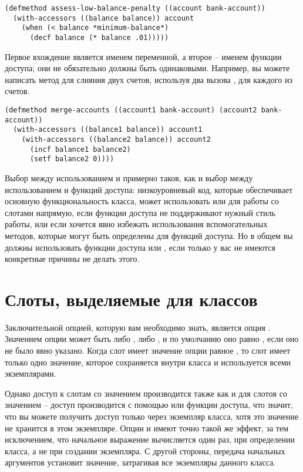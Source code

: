 \begin{lstlisting}
(defmethod assess-low-balance-penalty ((account bank-account))
  (with-accessors ((balance balance)) account
    (when (< balance *minimum-balance*)
      (decf balance (* balance .01)))))
\end{lstlisting}

Первое вхождение  является именем переменной, а второе -- именем функции
доступа; они не обязательно должны быть одинаковыми.  Например, вы можете написать метод
для слияния двух счетов, используя два вызова , для каждого из
счетов.

\begin{lstlisting}
(defmethod merge-accounts ((account1 bank-account) (account2 bank-account))
  (with-accessors ((balance1 balance)) account1
    (with-accessors ((balance2 balance)) account2
      (incf balance1 balance2)
      (setf balance2 0))))
\end{lstlisting}

Выбор между использованием  и  примерно таков, как и
выбор между использованием  и функций доступа: низкоуровневый код,
которые обеспечивает основную функциональность класса, может использовать
 или  для работы со слотами напрямую, если функции
доступа не поддерживают нужный стиль работы, или если хочется явно избежать использования
вспомогательных методов, которые могут быть определены для функций доступа.  Но в общем вы
должны использовать функции доступа или , если только у вас не
имеются конкретные причины не делать этого.

\section{Слоты, выделяемые для классов}

Заключительной опцией, которую вам необходимо знать, является опция .
Значением опции  может быть либо , либо , и
по умолчанию оно равно , если оно не было явно указано.  Когда слот имеет
значение опции равное , то слот имеет только одно значение, которое
сохраняется внутри класса и используется всеми экземплярами.

Однако доступ к слотам со значением  производится также как и для слотов со
значением  -- доступ производится с помощью  или функции
доступа, что значит, что вы можете получить доступ только через экземпляр класса, хотя это
значение не хранится в этом экземпляре.  Опции  и  имеют
точно такой же эффект, за тем исключением, что начальное выражение вычисляется один раз,
при определении класса, а не при создании экземпляра.  С другой стороны, передача
начальных аргументов  установит значение, затрагивая все экземпляры
данного класса.

